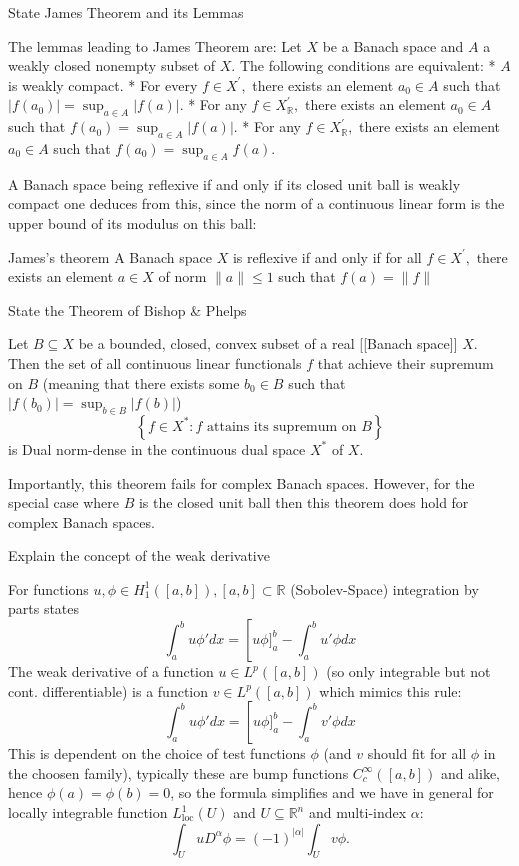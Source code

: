 State James Theorem and its Lemmas


The lemmas leading to James Theorem are:
Let \(X\) be a Banach space and \(A\) a weakly closed nonempty subset of \(X.\) The following conditions are equivalent:
* \(A\) is weakly compact.
* For every \(f \in X^{\prime},\) there exists an element \(a_0 \in A\) such that \(\left|f\left(a_0\right)\right| = \sup_{a \in A} |f(a)|\).
* For any \(f \in X^{\prime}_{\mathbb{R}},\) there exists an element \(a_0 \in A\) such that \(f\left(a_0\right) = \sup_{a \in A} |f(a)|\).
* For any \(f \in X^{\prime}_{\mathbb{R}},\) there exists an element \(a_0 \in A\) such that \(f\left(a_0\right) = \sup_{a \in A} f(a)\).

A Banach space being reflexive if and only if its closed unit ball is weakly compact one deduces from this, 
since the norm of a continuous linear form is the upper bound of its modulus on this ball:

James's theorem
A Banach space \(X\) is reflexive if and only if for all \(f \in X^{\prime},\) 
there exists an element \(a \in X\) of norm \(\|a\| \leq 1\) such that \(f(a) = \|f\|\)


State the Theorem of Bishop \& Phelps


Let \(B \subseteq X\) be a bounded, closed, convex subset of a real [[Banach space]] \(X.\) Then the set of all continuous linear functionals \(f\) that achieve 
their supremum on \(B\) (meaning that there exists some \(b_0 \in B\) such that \(|f(b_0)| = \sup_{b \in B} |f(b)|\)) 
\[
    \left\{f \in X^\ast : f \text{ attains its supremum on } B\right\}
\]
is Dual norm-dense in the continuous dual space \(X^*\) of \(X.\) 

Importantly, this theorem fails for complex Banach spaces.
However, for the special case where \(B\) is the closed unit ball then this theorem does hold for complex Banach spaces.


Explain the concept of the weak derivative


For functions \( u, \phi \in H^1_1([a, b]), [a, b] \subset \mathbb{R} \) (Sobolev-Space) integration by parts states
\[
    \int_a^b u \phi' dx = \left [u \phi]_a^b - \int_a^b u' \phi dx \right.
\]
The weak derivative of a function \( u \in L^p([a, b]) \) (so only integrable but not cont. differentiable) is a function 
\( v \in L^p([a, b]) \) which mimics this rule:
\[
    \int_a^b u \phi' dx = \left [u \phi]_a^b - \int_a^b v' \phi dx \right.
\]
This is dependent on the choice of test functions \( \phi \) (and \( v \) should fit for all \( \phi \) in the choosen family), 
typically these are bump functions \( C^\infty_{c}([a, b]) \) and alike, hence \( \phi(a) = \phi(b) = 0 \), so the formula simplifies 
and we have in general for locally integrable function \( L^1_{\text{loc}}(U) \) and \( U \subseteq \mathbb{R}^n \)
and multi-index \( \alpha \):
\[
    \int_U u D^\alpha \phi = (-1)^{|\alpha|} \int_U v \phi.
\]


